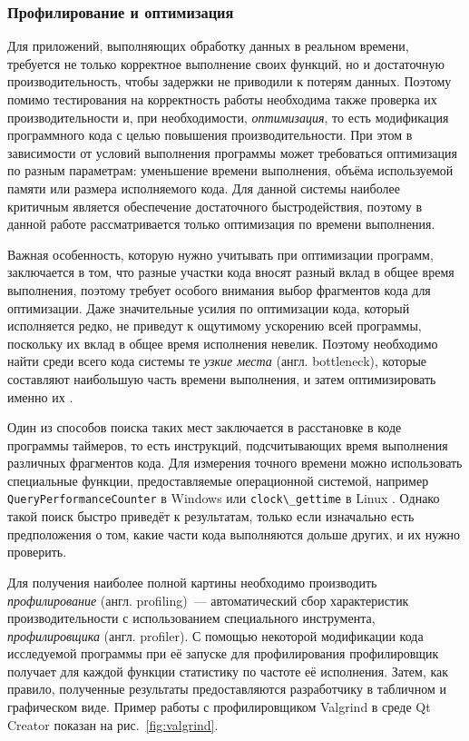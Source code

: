 \documentclass[a4paper, 14pt, titlepage]{extarticle}
\newcommand{\inlinecode}[1]{\lstinline[basicstyle=\ttfamily]{#1}}
\newcommand{\eng}[1]{\foreignlanguage{english}{#1}}
\newcommand{\term}[1]{\emph{#1}}
\begin{document}
  \subsubsection{Профилирование и оптимизация}

  Для приложений, выполняющих обработку данных в реальном времени, требуется не только корректное
  выполнение своих функций, но и достаточную производительность, чтобы задержки не приводили к
  потерям данных. Поэтому помимо тестирования на корректность работы необходима также проверка их
  производительности и, при необходимости, \term{оптимизация}, то есть модификация программного кода
  с целью повышения производительности. При этом в зависимости от условий выполнения программы может
  требоваться оптимизация по разным параметрам: уменьшение времени выполнения, объёма используемой
  памяти или размера исполняемого кода. Для данной системы наиболее критичным является обеспечение
  достаточного быстродействия, поэтому в данной работе рассматривается только оптимизация по времени
  выполнения.

  Важная особенность, которую нужно учитывать при оптимизации программ, заключается в том, что
  разные участки кода вносят разный вклад в общее время выполнения, поэтому требует особого внимания
  выбор фрагментов кода для оптимизации. Даже значительные усилия по оптимизации кода, который
  исполняется редко, не приведут к ощутимому ускорению всей программы, поскольку их вклад в общее
  время исполнения невелик. Поэтому необходимо найти среди всего кода системы те \term{узкие места}
  (англ. \eng{bottleneck}), которые составляют наибольшую часть времени выполнения, и затем
  оптимизировать именно их \cite{wadleigh-optimization}.

  Один из способов поиска таких мест заключается в расстановке в коде программы таймеров, то есть
  инструкций, подсчитывающих время выполнения различных фрагментов кода. Для измерения точного
  времени можно использовать специальные функции, предоставляемые операционной системой, например
  \inlinecode{QueryPerformanceCounter} в Windows \cite{queryperformancecounter} или
  \inlinecode{clock\_gettime} в Linux \cite{clockgettime}. Однако такой поиск быстро приведёт к
  результатам, только если изначально есть предположения о том, какие части кода выполняются дольше
  других, и их нужно проверить.

  Для получения наиболее полной картины необходимо производить \term{профилирование} (англ.
  \eng{profiling})~--- автоматический сбор характеристик производительности с использованием
  специального инструмента, \term{профилировщика} (англ. \eng{profiler}). С помощью некоторой
  модификации кода исследуемой программы при её запуске для профилирования профилировщик получает
  для каждой функции статистику по частоте её исполнения. Затем, как правило, полученные результаты
  предоставляются разработчику в табличном и графическом виде. Пример работы с профилировщиком
  Valgrind \cite{valgrind} в среде Qt Creator показан на рис.~\ref{fig:valgrind}.
\end{document}

